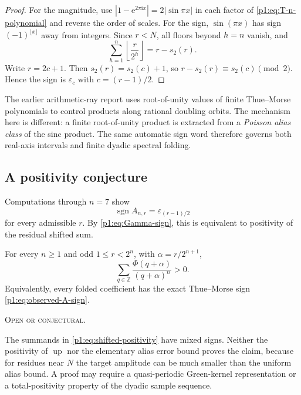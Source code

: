 \documentclass[11pt,oneside]{article}
\theoremstyle{definition}
\theoremstyle{remark}
\newcommand{\Z}{\mathbb Z}
\newcommand{\Up}{\operatorname{up}}
\newcommand{\e}{\mathrm e}
\newcommand{\ii}{\mathrm i}
\newcommand{\eps}{\varepsilon}
\newcommand{\PhiU}{\Phi}
\newcommand{\openstatus}{\textcolor{conjectureorange}{\textsc{Open or conjectural.}}}
\begin{document}
\begin{proof}
For the magnitude, use $|1-\e^{2\pi\ii x}|=2|\sin\pi x|$ in each factor of
\eqref{p1:eq:T-n-polynomial} and reverse the order of scales.  For the sign,
$\sin(\pi x)$ has sign $(-1)^{\lfloor x\rfloor}$ away from integers.  Since
$r<N$, all floors beyond $h=n$ vanish, and
\[
 \sum_{h=1}^{n}\left\lfloor\frac r{2^h}\right\rfloor
 =r-s_2(r).
\]
Write $r=2c+1$.  Then $s_2(r)=s_2(c)+1$, so
$r-s_2(r)\equiv s_2(c)\pmod2$.  Hence the sign is $\eps_c$ with
$c=(r-1)/2$.
\end{proof}

\begin{remark}
The earlier arithmetic-ray report uses root-of-unity values of finite
Thue--Morse polynomials to control products along rational doubling orbits.  The
mechanism here is different: a finite root-of-unity product is extracted from a
\emph{Poisson alias class} of the sinc product.  The same automatic sign word
therefore governs both real-axis intervals and finite dyadic spectral folding.
\end{remark}

\subsection{A positivity conjecture}

Computations through $n=7$ show
\begin{equation}\label{p1:eq:observed-A-sign}
 \operatorname{sgn}A_{n,r}=\eps_{(r-1)/2}
\end{equation}
for every admissible $r$.  By \eqref{p1:eq:Gamma-sign}, this is equivalent to
positivity of the residual shifted sum.

\begin{conjecture}\label{p1:conj:shifted-positivity}
For every $n\ge1$ and odd $1\le r<2^n$, with
$\alpha=r/2^{n+1}$,
\begin{equation}\label{p1:eq:shifted-positivity}
 \boxed{
 \sum_{q\in\Z}\frac{\PhiU(q+\alpha)}{(q+\alpha)^n}>0.}
\end{equation}
Equivalently, every folded coefficient has the exact Thue--Morse sign
\eqref{p1:eq:observed-A-sign}.

\smallskip\noindent\openstatus
\end{conjecture}

\begin{remark}
The summands in \eqref{p1:eq:shifted-positivity} have mixed signs.  Neither the
positivity of $\Up$ nor the elementary alias error bound proves the claim,
because for residues near $N$ the target amplitude can be much smaller than the
uniform alias bound.  A proof may require a quasi-periodic Green-kernel
representation or a total-positivity property of the dyadic sample sequence.
\end{remark}
\end{document}
